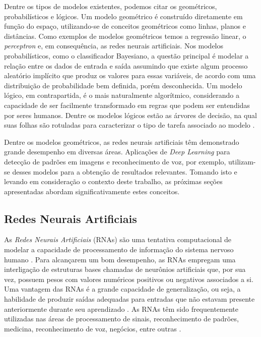 Dentre os tipos de modelos existentes, podemos citar os geométricos, probabilísticos e lógicos. Um modelo geométrico é construído diretamente em função do espaço, utilizando-se de conceitos geométricos como linhas, planos e distâncias. Como exemplos de modelos geométricos temos a regressão linear, o \emph{perceptron} e, em consequência, as redes neurais artificiais. Nos modelos probabilísticos, como o classificador Bayesiano, a questão principal é modelar a relação entre os dados de entrada e saída assumindo que existe algum processo aleatório implícito que produz os valores para essas variáveis, de acordo com uma distribuição de probabilidade bem definida, porém desconhecida. Um modelo lógico, em contrapartida, é o mais naturalmente algorítmico, considerando a capacidade de ser facilmente transformado em regras que podem ser entendidas por seres humanos. Dentre os modelos lógicos estão as árvores de decisão, na qual suas folhas são rotuladas para caracterizar o tipo de tarefa associado ao modelo \cite{flach}.

Dentre os modelos geométricos, as redes neurais artificiais têm demonstrado grande desempenho em diversas áreas. Aplicações de \emph{Deep Learning} para detecção de padrões em imagens e reconhecimento de voz, por exemplo, utilizam-se desses modelos para a obtenção de resultados relevantes. Tomando isto e levando em consideração o contexto deste trabalho, as próximas seções apresentadas abordam significativamente estes conceitos.


\subsection{Redes Neurais Artificiais}
\label{subsec:rna}

As \emph{Redes Neurais Artificiais} (RNAs) são uma tentativa computacional de modelar a capacidade de processamento de informação do sistema nervoso humano \cite{rojas}. Para alcançarem um bom desempenho, as RNAs empregam uma interligação de estruturas bases chamadas de neurônios artificiais que, por sua vez, possuem pesos com valores numéricos positivos ou negativos associados a si. Uma vantagem das RNAs é a grande capacidade de generalização, ou seja, a habilidade de produzir saídas adequadas para entradas que não estavam presente anteriormente durante seu aprendizado \cite{haykin}. As RNAs têm sido frequentemente utilizadas nas áreas de processamento de sinais, reconhecimento de padrões, medicina, reconhecimento de voz, negócios, entre outras \cite{fausett}.

